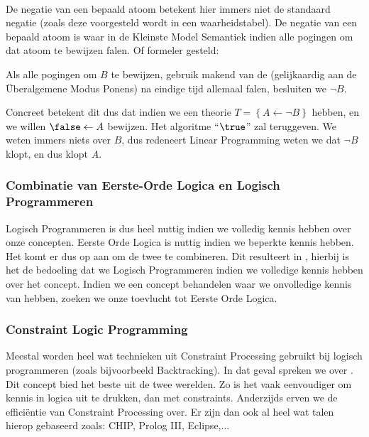 \paragraph{}
De negatie van een bepaald atoom betekent hier immers niet de standaard negatie (zoals deze voorgesteld wordt in een waarheidstabel). De negatie van een bepaald atoom is waar in de Kleinste Model Semantiek indien alle pogingen om dat atoom te bewijzen falen. Of formeler gesteld:
\begin{theorem}
Als alle pogingen om $B$ te bewijzen, gebruik makend van de  (gelijkaardig aan de \"Uberalgemene Modus Ponens) na eindige tijd allemaal falen, besluiten we $\neg B$.
\end{theorem}
Concreet betekent dit dus dat indien we een theorie $T=\left\{A\leftarrow\neg B\right\}$ hebben, en we willen $\false\leftarrow A$ bewijzen. Het algoritme ``$\true$'' zal teruggeven. We weten immers niets over $B$, dus redeneert Linear Programming weten we dat $\neg B$ klopt, en dus klopt $A$.
\subsubsection{Combinatie van Eerste-Orde Logica en Logisch Programmeren}
Logisch Programmeren is dus heel nuttig indien we volledig kennis hebben over onze concepten. Eerste Orde Logica is nuttig indien we beperkte kennis hebben. Het komt er dus op aan om de twee te combineren. Dit resulteert in , hierbij is het de bedoeling dat we Logisch Programmeren indien we volledige kennis hebben over het concept. Indien we een concept behandelen waar we onvolledige kennis van hebben, zoeken we onze toevlucht tot Eerste Orde Logica.
\subsubsection{Constraint Logic Programming}
Meestal worden heel wat technieken uit Constraint Processing gebruikt bij logisch programmeren (zoals bijvoorbeeld Backtracking). In dat geval spreken we over . Dit concept bied het beste uit de twee werelden. Zo is het vaak eenvoudiger om kennis in logica uit te drukken, dan met constraints. Anderzijds erven we de effici\"entie van Constraint Processing over. Er zijn dan ook al heel wat talen hierop gebaseerd zoals: CHIP, Prolog III, Eclipse,...
